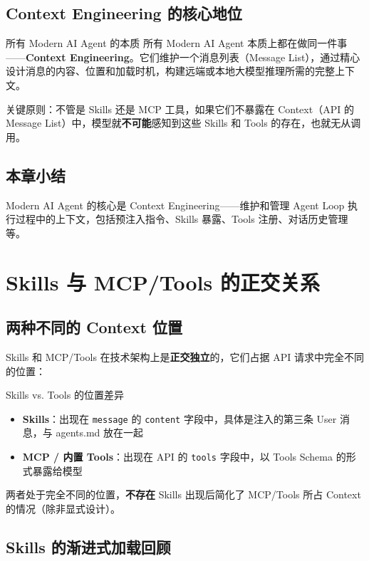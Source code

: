 \documentclass[a4paper]{article}
\begin{document}
\subsection{Context Engineering 的核心地位}

\begin{importantbox}{所有 Modern AI Agent 的本质}
所有 Modern AI Agent 本质上都在做同一件事——\textbf{Context Engineering}。它们维护一个消息列表（Message List），通过精心设计消息的内容、位置和加载时机，构建远端或本地大模型推理所需的完整上下文。

关键原则：不管是 Skills 还是 MCP 工具，如果它们不暴露在 Context（API 的 Message List）中，模型就\textbf{不可能}感知到这些 Skills 和 Tools 的存在，也就无从调用。
\end{importantbox}

\subsection{本章小结}

Modern AI Agent 的核心是 Context Engineering——维护和管理 Agent Loop 执行过程中的上下文，包括预注入指令、Skills 暴露、Tools 注册、对话历史管理等。


\section{Skills 与 MCP/Tools 的正交关系}

\subsection{两种不同的 Context 位置}

Skills 和 MCP/Tools 在技术架构上是\textbf{正交独立}的，它们占据 API 请求中完全不同的位置：

\begin{importantbox}{Skills vs. Tools 的位置差异}
\begin{itemize}
    \item \textbf{Skills}：出现在 \texttt{message} 的 \texttt{content} 字段中，具体是注入的第三条 User 消息，与 agents.md 放在一起
    \item \textbf{MCP / 内置 Tools}：出现在 API 的 \texttt{tools} 字段中，以 Tools Schema 的形式暴露给模型
\end{itemize}
两者处于完全不同的位置，\textbf{不存在} Skills 出现后简化了 MCP/Tools 所占 Context 的情况（除非显式设计）。
\end{importantbox}

\subsection{Skills 的渐进式加载回顾}
\end{document}
